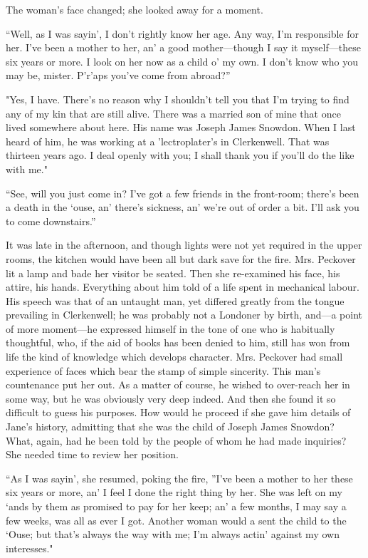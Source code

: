 The woman's face changed; she looked away for a moment.

``Well, as I was sayin', I don't rightly know her age. Any way, I'm
responsible for her. I've been a mother to her, an' a good
mother---though I say it myself---these six years or more. I look on her
now as a child o' my own. I don't know who you may be, mister. P'r'aps
you've come from abroad?''

"Yes, I have. There's no reason why I shouldn't tell you that I'm trying
to find any of my kin that are still alive. There was a married son of
mine that once lived somewhere about here. His name was Joseph James
Snowdon. When I last heard of him, {\protect\hypertarget{107}{}{}}he was
working at a 'lectroplater's in Clerkenwell. That was thirteen years
ago. I deal openly with you; I shall thank you if you'll do the like
with me."

``See, will you just come in? I've got a few friends in the front-room;
there's been a death in the `ouse, an' there's sickness, an' we're out
of order a bit. I'll ask you to come downstairs.''

It was late in the afternoon, and though lights were not yet required in
the upper rooms, the kitchen would have been all but dark save for the
fire. Mrs. Peckover lit a lamp and bade her visitor be seated. Then she
re-examined his face, his attire, his hands. Everything about him told
of a life spent in mechanical labour. His speech was that of an untaught
man, yet differed greatly from the tongue prevailing in Clerkenwell; he
was probably not a Londoner by birth, and---a point of more moment---he
expressed himself in the tone of one who is habitually thoughtful, who,
if the aid of books has been denied to him, still has won from life
{\protect\hypertarget{108}{}{}}the kind of knowledge which develops
character. Mrs. Peckover had small experience of faces which bear the
stamp of simple sincerity. This man's countenance put her out. As a
matter of course, he wished to over-reach her in some way, but he was
obviously very deep indeed. And then she found it so difficult to guess
his purposes. How would he proceed if she gave him details of Jane's
history, admitting that she was the child of Joseph James Snowdon? What,
again, had he been told by the people of whom he had made inquiries? She
needed time to review her position.

``As I was sayin', she resumed, poking the fire, ''I've been a mother to
her these six years or more, an' I feel I done the right thing by her.
She was left on my `ands by them as promised to pay for her keep; an' a
few months, I may say a few weeks, was all as ever I got. Another woman
would a sent the child to the `Ouse; but that's always the way with me;
I'm always actin' against my own interesses."

